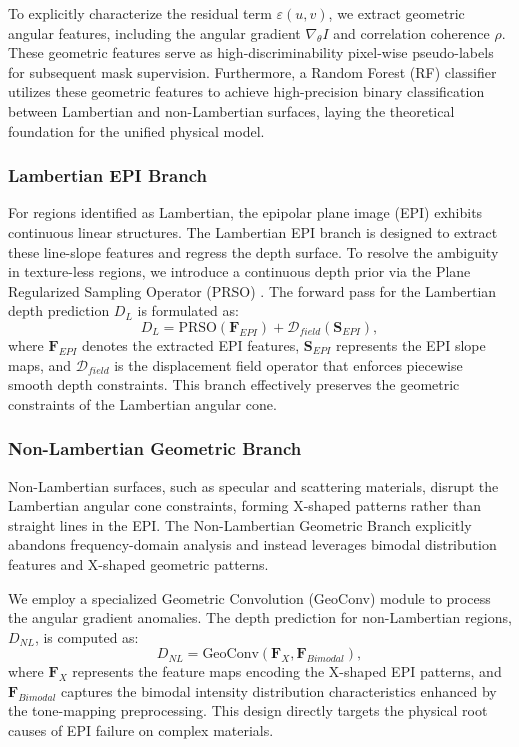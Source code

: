 To explicitly characterize the residual term $\varepsilon(u,v)$, we extract geometric angular features, including the angular gradient $\nabla_{\theta} I$ and correlation coherence $\rho$. These geometric features serve as high-discriminability pixel-wise pseudo-labels for subsequent mask supervision. Furthermore, a Random Forest (RF) classifier utilizes these geometric features to achieve high-precision binary classification between Lambertian and non-Lambertian surfaces, laying the theoretical foundation for the unified physical model.

\subsubsection{Lambertian EPI Branch}
For regions identified as Lambertian, the epipolar plane image (EPI) exhibits continuous linear structures. The Lambertian EPI branch is designed to extract these line-slope features and regress the depth surface. To resolve the ambiguity in texture-less regions, we introduce a continuous depth prior via the Plane Regularized Sampling Operator (PRSO) \cite{wang2022prso}. The forward pass for the Lambertian depth prediction $D_L$ is formulated as:
\begin{equation}
    D_L = \text{PRSO}(\mathbf{F}_{EPI}) + \mathcal{D}_{field}(\mathbf{S}_{EPI}),
    \label{eq:ch3_2}
\end{equation}
where $\mathbf{F}_{EPI}$ denotes the extracted EPI features, $\mathbf{S}_{EPI}$ represents the EPI slope maps, and $\mathcal{D}_{field}$ is the displacement field operator that enforces piecewise smooth depth constraints. This branch effectively preserves the geometric constraints of the Lambertian angular cone.

\subsubsection{Non-Lambertian Geometric Branch}
Non-Lambertian surfaces, such as specular and scattering materials, disrupt the Lambertian angular cone constraints, forming X-shaped patterns rather than straight lines in the EPI. The Non-Lambertian Geometric Branch explicitly abandons frequency-domain analysis and instead leverages bimodal distribution features and X-shaped geometric patterns. 

We employ a specialized Geometric Convolution (GeoConv) module to process the angular gradient anomalies. The depth prediction for non-Lambertian regions, $D_{NL}$, is computed as:
\begin{equation}
    D_{NL} = \text{GeoConv}(\mathbf{F}_{X}, \mathbf{F}_{Bimodal}),
    \label{eq:ch3_3}
\end{equation}
where $\mathbf{F}_{X}$ represents the feature maps encoding the X-shaped EPI patterns, and $\mathbf{F}_{Bimodal}$ captures the bimodal intensity distribution characteristics enhanced by the tone-mapping preprocessing. This design directly targets the physical root causes of EPI failure on complex materials.

